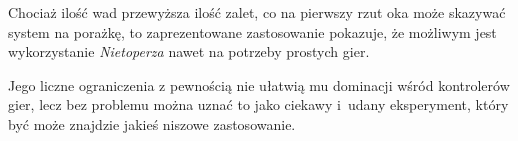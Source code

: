 
Chociaż ilość wad przewyższa ilość zalet, co na pierwszy rzut oka może skazywać system na porażkę, to zaprezentowane zastosowanie pokazuje, że możliwym jest wykorzystanie \textsl{Nietoperza} nawet na potrzeby prostych gier.

Jego liczne ograniczenia z pewnością nie ułatwią mu dominacji wśród kontrolerów gier, lecz bez problemu można uznać to jako ciekawy i~udany eksperyment, który być może znajdzie jakieś niszowe zastosowanie.


